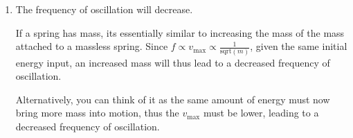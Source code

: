 \documentclass[11pt]{article}
\def\doubleunderline#1{\underline{\underline{#1}}}
\begin{document}
\begin{enumerate}[label={[D\arabic*]},itemsep={1em}]
\begin{enumerate}
\begin{enumerate}[label={(\roman*)}]
						\item 
							\begin{enumerate}[label={\arabic*.}]
								\item Max speed occurs when all the energy is converted to KE:
									\begin{equation*}
										\frac{1}{2}mv_\text{max}^2 = 0.004 \implies v_\text{max} = \sqrt{\frac{2\times 0.004}{W\!/g}} = \doubleunderline{\SI{0.14}{\meter\per\second}}
									\end{equation*}
								\item \textcolor{white}{.}
									\vspace{-2.2em}
									\begin{align*}
										v_\text{max} = \omega x_0 \implies \omega = 2\pi\!f &= \frac{v_\text{max}}{x_0} \\
										f &= \frac{v_\text{max}}{2\pi x_0} = \frac{0.14}{2\pi\times\num{0.80e-2}} = \doubleunderline{\SI{2.8}{\hertz}}
									\end{align*}
							\end{enumerate}
					\end{enumerate}
				\item The frequency of oscillation will decrease. 
				
				If a spring has mass, its essentially similar to increasing the mass of the mass attached to a massless spring. Since $f \propto v_\text{max} \propto \frac{1}{\text{sqrt}\left(m\right)}$, given the same initial energy input, an increased mass will thus lead to a decreased frequency of oscillation.
				
				Alternatively, you can think of it as the same amount of energy must now bring more mass into motion, thus the $v_\text{max}$ must be lower, leading to a decreased frequency of oscillation.
			\end{enumerate}
	\end{enumerate}
\end{document}
